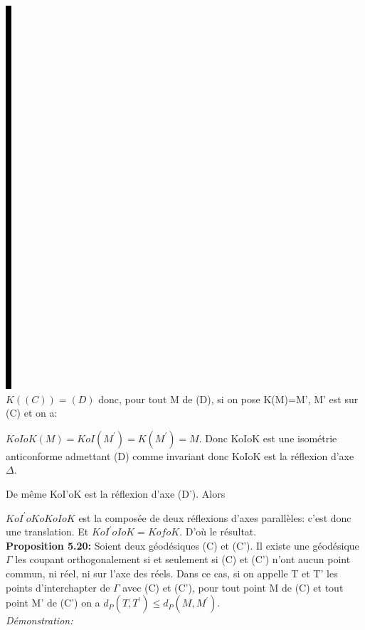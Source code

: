 \documentclass[a4paper, 12pt, twoside]{book}
\begin{document}
  \includegraphics[scale=0.7]{figures/isom23.eps}\\
  
  
  $K((C))=(D)$ donc, pour tout M de (D), si on pose K(M)=M', M' est sur (C) et on a:\
 
 $KoIoK(M)=KoI(M^{'})=K(M^{'})=M$. Donc KoIoK est une isométrie anticonforme admettant (D) comme invariant donc KoIoK est la réflexion d'axe $\Delta$.\
 
 
 De même KoI'oK est la réflexion d'axe (D'). Alors\
 
 $KoI^{'}oKoKoIoK$ est la composée de deux réflexions d'axes parallèles: c'est donc une translation. Et $KoI^{'}oIoK=KofoK$. D'où le résultat.\\
 
 \newpage \textbf{Proposition 5.20:} Soient deux géodésiques (C) et (C'). Il existe une géodésique $\Gamma$ les coupant orthogonalement si et seulement si (C) et (C') n'ont aucun point commun, ni réel, ni sur l'axe des réels. Dans ce cas, si on appelle T et T' les points d'interchapter de $\Gamma$  avec (C) et (C'), pour tout point M de (C) et tout point M' de (C') on a $d_{P}(T,T^{'})\leq d_{P}(M, M^{'})$.\\
 
 \textit{Démonstration:}\\
 
\end{document}
